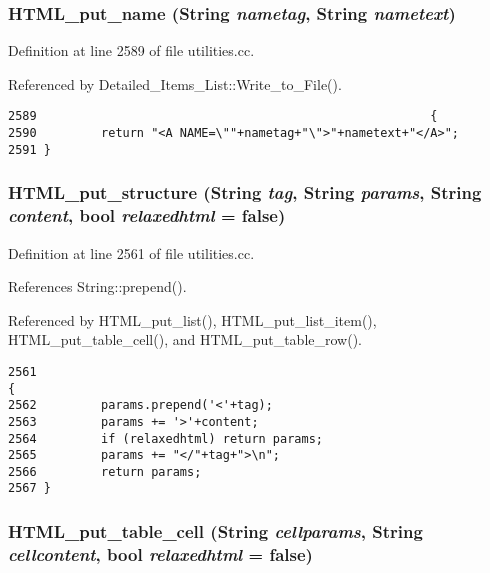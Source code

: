 \subsubsection{ HTML\_\-put\_\-name ({\bf String} {\em nametag}, {\bf String} {\em nametext})}\label{utilities_8cc_a69}




Definition at line 2589 of file utilities.cc.

Referenced by Detailed\_\-Items\_\-List::Write\_\-to\_\-File().



\footnotesize\begin{verbatim}2589                                                       {
2590         return "<A NAME=\""+nametag+"\">"+nametext+"</A>";
2591 }
\end{verbatim}\normalsize 
{}
\subsubsection{ HTML\_\-put\_\-structure ({\bf String} {\em tag}, {\bf String} {\em params}, {\bf String} {\em content}, bool {\em relaxedhtml} = {\bf false})}\label{utilities_8cc_a63}




Definition at line 2561 of file utilities.cc.

References String::prepend().

Referenced by HTML\_\-put\_\-list(), HTML\_\-put\_\-list\_\-item(), HTML\_\-put\_\-table\_\-cell(), and HTML\_\-put\_\-table\_\-row().



\footnotesize\begin{verbatim}2561                                                                                                {
2562         params.prepend('<'+tag);
2563         params += '>'+content;
2564         if (relaxedhtml) return params;
2565         params += "</"+tag+">\n";
2566         return params;
2567 }
\end{verbatim}\normalsize 
{}
\subsubsection{ HTML\_\-put\_\-table\_\-cell ({\bf String} {\em cellparams}, {\bf String} {\em cellcontent}, bool {\em relaxedhtml} = {\bf false})}\label{utilities_8cc_a65}




